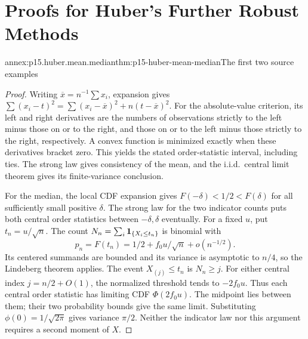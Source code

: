\chapter{Proofs for Huber's Further Robust Methods}
\label{annex:p15-huber-remaining-methods}

\begin{annexitem}{annex:p15.huber.mean.median}{thm:p15-huber-mean-median}{The first two source examples}
\begin{proof}
Writing \(\overline x=n^{-1}\sum x_i\), expansion gives
\(\sum(x_i-t)^2=\sum(x_i-\overline x)^2+n(t-\overline x)^2\).
For the absolute-value criterion, its left and right derivatives
are the numbers of observations strictly to the left minus those
on or to the right, and those on or to the left minus those strictly
to the right, respectively. A convex function is minimized exactly
when these derivatives bracket zero. This yields the stated
order-statistic interval, including ties.
The strong law gives consistency of the mean, and the i.i.d.\
central limit theorem gives its finite-variance conclusion.

For the median, the local CDF expansion gives
\(F(-\delta)<1/2<F(\delta)\) for all sufficiently small positive
\(\delta\). The strong law for the two indicator counts puts
both central order statistics between \(-\delta,\delta\) eventually.
For a fixed \(u\), put \(t_n=u/\sqrt n\).
The count \(N_n=\sum_i{\bf1}_{\{X_i\leq t_n\}}\) is binomial with
\[
 p_n=F(t_n)=1/2+f_0u/\sqrt n+o(n^{-1/2}).
\]
Its centered summands are bounded and its variance is asymptotic
to \(n/4\), so the Lindeberg theorem applies. The event
\(X_{(j)}\leq t_n\) is \(N_n\geq j\). For either central index
\(j=n/2+O(1)\), the normalized threshold tends to \(-2f_0u\).
Thus each central order statistic has limiting CDF \(\Phi(2f_0u)\).
The midpoint lies between them; their two probability bounds give
the same limit. Substituting \(\phi(0)=1/\sqrt{2\pi}\) gives
variance \(\pi/2\). Neither the indicator law nor this argument
requires a second moment of \(X\).
\end{proof}
\end{annexitem}

